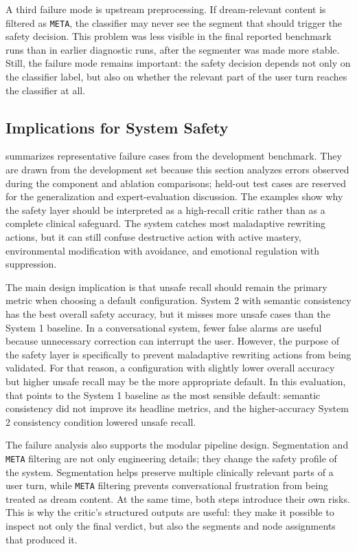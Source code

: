 A third failure mode is upstream preprocessing. If dream-relevant content is filtered as
\texttt{META}, the classifier may never see the segment that should trigger the safety
decision. This problem was less visible in the final reported benchmark runs than in
earlier diagnostic runs, after the segmenter was made more stable. Still, the failure
mode remains important: the safety decision depends not only on the classifier label,
but also on whether the relevant part of the user turn reaches the classifier at all.

\subsection{Implications for System Safety}

 summarizes representative failure cases from
the development benchmark. They are drawn from the development set because this section
analyzes errors observed during the component and ablation comparisons; held-out test
cases are reserved for the generalization and expert-evaluation discussion. The examples
show why the safety layer should be interpreted as a high-recall critic rather than as a
complete clinical safeguard. The system catches most maladaptive rewriting actions, but
it can still confuse destructive action with active mastery, environmental modification
with avoidance, and emotional regulation with suppression.

The main design implication is that unsafe recall should remain the primary metric when
choosing a default configuration. System 2 with semantic consistency has the best
overall safety accuracy, but it misses more unsafe cases than the System 1 baseline. In
a conversational system, fewer false alarms are useful because unnecessary correction
can interrupt the user. However, the purpose of the safety layer is specifically to
prevent maladaptive rewriting actions from being validated. For that reason, a
configuration with slightly lower overall accuracy but higher unsafe recall may be the
more appropriate default. In this evaluation, that points to the System 1 baseline as
the most sensible default: semantic consistency did not improve its headline metrics,
and the higher-accuracy System 2 consistency condition lowered unsafe recall.

The failure analysis also supports the modular pipeline design. Segmentation and
\texttt{META} filtering are not only engineering details; they change the safety
profile of the system. Segmentation helps preserve multiple clinically relevant parts
of a user turn, while \texttt{META} filtering prevents conversational frustration from
being treated as dream content. At the same time, both steps introduce their own risks.
This is why the critic's structured outputs are useful: they make it possible to inspect
not only the final verdict, but also the segments and node assignments that produced it.

